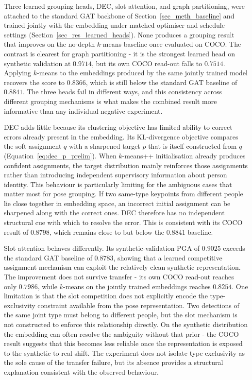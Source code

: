 Three learned grouping heads, DEC, slot attention, and graph
partitioning, were attached to the standard GAT backbone of
Section~\ref{sec_meth_baseline} and trained jointly with the embedding
under matched optimiser and schedule settings
(Section~\ref{sec_res_learned_heads}).
None produces a grouping result that improves on the no-depth $k$-means
baseline once evaluated on COCO.
The contrast is clearest for graph partitioning -
it is the strongest learned head on synthetic validation at $0.9714$,
but its own COCO read-out falls to $0.7514$.
Applying $k$-means to the embeddings produced by the same jointly
trained model recovers the score to $0.8366$,
which is still below the standard GAT baseline of $0.8841$.
The three heads fail in different ways,
and this consistency across different grouping mechanisms is what makes
the combined result more informative than any individual negative
experiment.

DEC adds little because its clustering objective has limited ability
to correct errors already present in the embedding.
Its KL-divergence objective compares the soft assignment $q$
with a sharpened target $p$ that is itself constructed from $q$
(Equation~\eqref{eq:dec_p_prelim}).
When $k$-means++ initialisation already produces confident assignments,
the target distribution mainly reinforces those assignments rather than
introducing independent supervisory information about person identity.
This behaviour is particularly limiting for the ambiguous cases that
matter most for pose grouping.
If two same-type keypoints from different people lie close together
in embedding space,
an incorrect initial assignment can be sharpened along with the
correct ones.
DEC therefore has no independent structural cue with which to resolve
the error.
This is consistent with its COCO result of $0.8798$,
which remains close to but below the $0.8841$ baseline.

Slot attention behaves differently.
Its synthetic-validation PGA of $0.9025$ exceeds the standard GAT
baseline of $0.8783$,
showing that a learned competitive assignment mechanism can exploit
the relatively clean synthetic representation.
The improvement does not survive transfer -
its own COCO read-out reaches only $0.7986$,
while $k$-means on the jointly trained embeddings reaches $0.8254$.
One limitation is that the slot competition does not explicitly encode
the type-exclusivity constraint available from the pose representation.
Two detections of the same joint type must belong to different people,
but the slot mechanism is not constructed to enforce this relationship
directly.
On the synthetic distribution the embedding can often resolve the
ambiguity without that prior -
the COCO result suggests that this becomes less reliable once the
representation is exposed to the synthetic-to-real shift.
The experiment does not isolate type-exclusivity as the sole cause
of the transfer failure,
but its absence provides a structural explanation consistent with the
observed behaviour.

